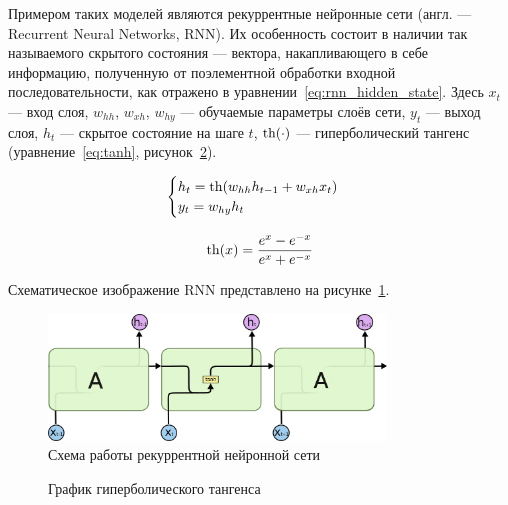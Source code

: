 Примером таких моделей являются рекуррентные нейронные сети (англ. --- Recurrent Neural Networks, RNN). Их особенность состоит в наличии так называемого скрытого состояния --- вектора, накапливающего в себе информацию, полученную от поэлементной обработки входной последовательности, как отражено в уравнении \ref*{eq:rnn_hidden_state}. Здесь $x_t$ --- вход слоя, $w_{hh}$, $w_{xh}$, $w_{hy}$ --- обучаемые параметры слоёв сети, $y_t$ --- выход слоя, $h_t$ --- скрытое состояние на шаге $t$, $\operatorname{th}(\cdot)$ --- гиперболический тангенс (уравнение \ref*{eq:tanh}, рисунок \ref*{fig:tanh}).

\begin{equation}
    \label{eq:rnn_hidden_state}
    \begin{cases}
        h_t = \operatorname{th}(w_{hh}h_{t-1}+w_{xh}x_t) \\
        y_t = w_{hy}h_t
    \end{cases}
\end{equation}

\begin{equation}
    \label{eq:tanh}
    \operatorname{th}(x)=\frac{e^x-e^{-x}}{e^x+e^{-x}}
\end{equation}

Схематическое изображение RNN представлено на рисунке \ref*{fig:rnn}.

\begin{figure}[h]
    \centering
    \includegraphics[width=0.8\textwidth]{../inc/images/rnn.png}
    \caption{Схема работы рекуррентной нейронной сети}
    \label{fig:rnn}
\end{figure}

\begin{figure}[h]
    \centering
    \caption{График гиперболического тангенса}
    \label{fig:tanh}
\end{figure}

